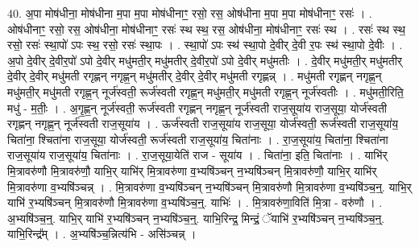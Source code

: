 \documentclass[17pt]{extarticle}
\begin{document}
40. अ॒पा मोष॑धीना॒ मोष॑धीना म॒पा म॒पा मोष॑धीनाꣳ॒॒ रसो॒ रस॒ ओष॑धीना म॒पा म॒पा मोष॑धीनाꣳ॒॒ रसः॑ । . ओष॑धीनाꣳ॒॒ रसो॒ रस॒ ओष॑धीना॒ मोष॑धीनाꣳ॒॒ रसः॑ स्थ स्थ॒ रस॒ ओष॑धीना॒ मोष॑धीनाꣳ॒॒ रसः॑ स्थ । . रसः॑ स्थ स्थ॒ रसो॒ रसः॑ स्था॒पो॑ ऽपः स्थ॒ रसो॒ रसः॑ स्था॒पः । . स्था॒पो॑ ऽपः स्थ॑ स्था॒पो दे॒वीर् दे॒वी र॒पः स्थ॑ स्था॒पो दे॒वीः । . अ॒पो दे॒वीर् दे॒वीर॒पो॑ ऽपो दे॒वीर् मधु॑मती॒र् मधु॑मतीर् दे॒वीर॒पो॑ ऽपो दे॒वीर् मधु॑मतीः । . दे॒वीर् मधु॑मती॒र् मधु॑मतीर् दे॒वीर् दे॒वीर् मधु॑मती रगृह्णन् नगृह्ण॒न् मधु॑मतीर् दे॒वीर् दे॒वीर् मधु॑मती रगृह्णन्न् । . मधु॑मती रगृह्णन् नगृह्ण॒न् मधु॑मती॒र् मधु॑मती रगृह्ण॒न् नूर्ज॑स्वती॒ रूर्ज॑स्वती रगृह्ण॒न् मधु॑मती॒र् मधु॑मती रगृह्ण॒न् नूर्ज॑स्वतीः । . मधु॑मती॒रिति॒ मधु॑ - म॒तीः॒ । . अ॒गृ॒ह्ण॒न् नूर्ज॑स्वती॒ रूर्ज॑स्वती रगृह्णन् नगृह्ण॒न् नूर्ज॑स्वती राज॒सूया॑य राज॒सूया॒ योर्ज॑स्वती रगृह्णन् नगृह्ण॒न् नूर्ज॑स्वती राज॒सूया॑य । . ऊर्ज॑स्वती राज॒सूया॑य राज॒सूया॒ योर्ज॑स्वती॒ रूर्ज॑स्वती राज॒सूया॑य॒ चिता॑ना॒ श्चिता॑ना राज॒सूया॒ योर्ज॑स्वती॒ रूर्ज॑स्वती राज॒सूया॑य॒ चिता॑नाः । . रा॒ज॒सूया॑य॒ चिता॑ना॒ श्चिता॑ना राज॒सूया॑य राज॒सूया॑य॒ चिता॑नाः । . रा॒ज॒सूया॒येति॑ राज - सूया॑य । . चिता॑ना॒ इति॒ चिता॑नाः । . याभि॑र् मि॒त्रावरु॑णौ मि॒त्रावरु॑णौ॒ याभि॒र् याभि॑र् मि॒त्रावरु॑णा व॒भ्यषि॑ञ्चन् न॒भ्यषि॑ञ्चन् मि॒त्रावरु॑णौ॒ याभि॒र् याभि॑र् मि॒त्रावरु॑णा व॒भ्यषि॑ञ्चन्न् । . मि॒त्रावरु॑णा व॒भ्यषि॑ञ्चन् न॒भ्यषि॑ञ्चन् मि॒त्रावरु॑णौ मि॒त्रावरु॑णा व॒भ्यषि॑ञ्च॒न्॒. याभि॒र् याभि॑ र॒भ्यषि॑ञ्चन् मि॒त्रावरु॑णौ मि॒त्रावरु॑णा व॒भ्यषि॑ञ्च॒न्॒. याभिः॑ । . मि॒त्रावरु॑णा॒विति॑ मि॒त्रा - वरु॑णौ । . अ॒भ्यषि॑ञ्च॒न्॒. याभि॒र् याभि॑ र॒भ्यषि॑ञ्चन् न॒भ्यषि॑ञ्च॒न्॒. याभि॒रिन्द्र॒ मिन्द्रं॒  
ॅयाभि॑ र॒भ्यषि॑ञ्चन् न॒भ्यषि॑ञ्च॒न्॒. याभि॒रिन्द्र᳚म् । . अ॒भ्यषि॑ञ्च॒न्नित्य॑भि - असि॑ञ्चन्न् । \newline
\end{document}

